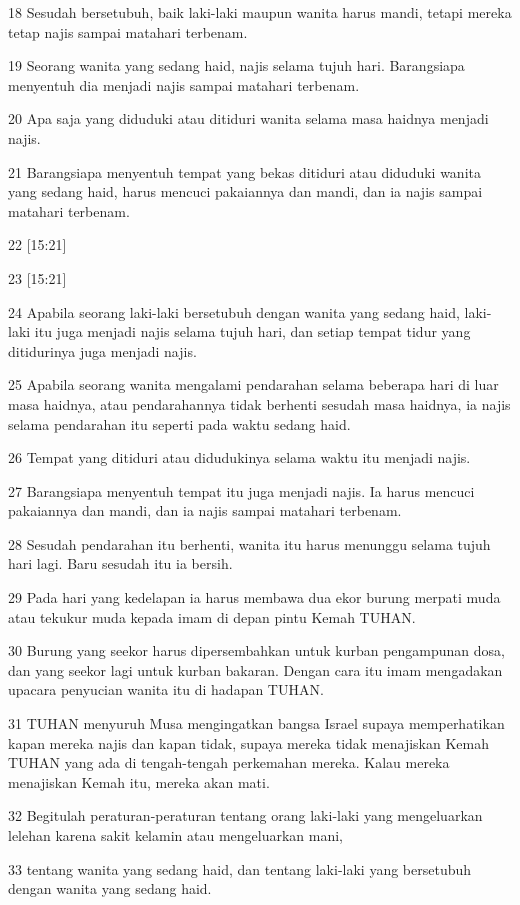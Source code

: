 \par 18 Sesudah bersetubuh, baik laki-laki maupun wanita harus mandi, tetapi mereka tetap najis sampai matahari terbenam.
\par 19 Seorang wanita yang sedang haid, najis selama tujuh hari. Barangsiapa menyentuh dia menjadi najis sampai matahari terbenam.
\par 20 Apa saja yang diduduki atau ditiduri wanita selama masa haidnya menjadi najis.
\par 21 Barangsiapa menyentuh tempat yang bekas ditiduri atau diduduki wanita yang sedang haid, harus mencuci pakaiannya dan mandi, dan ia najis sampai matahari terbenam.
\par 22 [15:21]
\par 23 [15:21]
\par 24 Apabila seorang laki-laki bersetubuh dengan wanita yang sedang haid, laki-laki itu juga menjadi najis selama tujuh hari, dan setiap tempat tidur yang ditidurinya juga menjadi najis.
\par 25 Apabila seorang wanita mengalami pendarahan selama beberapa hari di luar masa haidnya, atau pendarahannya tidak berhenti sesudah masa haidnya, ia najis selama pendarahan itu seperti pada waktu sedang haid.
\par 26 Tempat yang ditiduri atau didudukinya selama waktu itu menjadi najis.
\par 27 Barangsiapa menyentuh tempat itu juga menjadi najis. Ia harus mencuci pakaiannya dan mandi, dan ia najis sampai matahari terbenam.
\par 28 Sesudah pendarahan itu berhenti, wanita itu harus menunggu selama tujuh hari lagi. Baru sesudah itu ia bersih.
\par 29 Pada hari yang kedelapan ia harus membawa dua ekor burung merpati muda atau tekukur muda kepada imam di depan pintu Kemah TUHAN.
\par 30 Burung yang seekor harus dipersembahkan untuk kurban pengampunan dosa, dan yang seekor lagi untuk kurban bakaran. Dengan cara itu imam mengadakan upacara penyucian wanita itu di hadapan TUHAN.
\par 31 TUHAN menyuruh Musa mengingatkan bangsa Israel supaya memperhatikan kapan mereka najis dan kapan tidak, supaya mereka tidak menajiskan Kemah TUHAN yang ada di tengah-tengah perkemahan mereka. Kalau mereka menajiskan Kemah itu, mereka akan mati.
\par 32 Begitulah peraturan-peraturan tentang orang laki-laki yang mengeluarkan lelehan karena sakit kelamin atau mengeluarkan mani,
\par 33 tentang wanita yang sedang haid, dan tentang laki-laki yang bersetubuh dengan wanita yang sedang haid.


